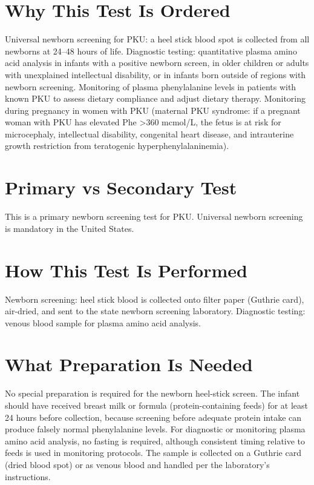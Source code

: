 \section*{Why This Test Is Ordered}
Universal newborn screening for PKU: a heel stick blood spot is collected from all newborns at 24--48 hours of life. Diagnostic testing: quantitative plasma amino acid analysis in infants with a positive newborn screen, in older children or adults with unexplained intellectual disability, or in infants born outside of regions with newborn screening. Monitoring of plasma phenylalanine levels in patients with known PKU to assess dietary compliance and adjust dietary therapy. Monitoring during pregnancy in women with PKU (maternal PKU syndrome: if a pregnant woman with PKU has elevated Phe >360 mcmol/L, the fetus is at risk for microcephaly, intellectual disability, congenital heart disease, and intrauterine growth restriction from teratogenic hyperphenylalaninemia).

\section*{Primary vs Secondary Test}
This is a primary newborn screening test for PKU. Universal newborn screening is mandatory in the United States.

\section*{How This Test Is Performed}
Newborn screening: heel stick blood is collected onto filter paper (Guthrie card), air-dried, and sent to the state newborn screening laboratory. Diagnostic testing: venous blood sample for plasma amino acid analysis.

\section*{What Preparation Is Needed}
No special preparation is required for the newborn heel-stick screen. The infant should have received breast milk or formula (protein-containing feeds) for at least 24 hours before collection, because screening before adequate protein intake can produce falsely normal phenylalanine levels. For diagnostic or monitoring plasma amino acid analysis, no fasting is required, although consistent timing relative to feeds is used in monitoring protocols. The sample is collected on a Guthrie card (dried blood spot) or as venous blood and handled per the laboratory's instructions.

